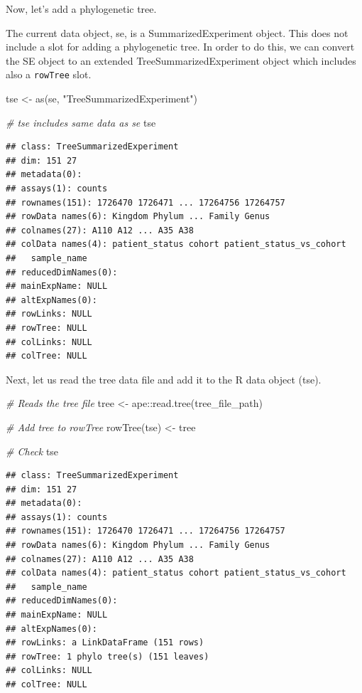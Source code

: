 \documentclass[
]{book}
\newenvironment{Shaded}{\begin{snugshade}}{\end{snugshade}}
\newcommand{\CommentTok}[1]{\textcolor[rgb]{0.56,0.35,0.01}{\textit{#1}}}
\newcommand{\FunctionTok}[1]{\textcolor[rgb]{0.00,0.00,0.00}{#1}}
\newcommand{\NormalTok}[1]{#1}
\newcommand{\OtherTok}[1]{\textcolor[rgb]{0.56,0.35,0.01}{#1}}
\newcommand{\SpecialCharTok}[1]{\textcolor[rgb]{0.00,0.00,0.00}{#1}}
\newcommand{\StringTok}[1]{\textcolor[rgb]{0.31,0.60,0.02}{#1}}
\begin{document}
Now, let's add a phylogenetic tree.

The current data object, se, is a SummarizedExperiment object. This
does not include a slot for adding a phylogenetic tree. In order to do
this, we can convert the SE object to an extended TreeSummarizedExperiment
object which includes also a \texttt{rowTree} slot.

\begin{Shaded}
\begin{Highlighting}[]
\NormalTok{tse }\OtherTok{\textless{}{-}} \FunctionTok{as}\NormalTok{(se, }\StringTok{"TreeSummarizedExperiment"}\NormalTok{)}

\CommentTok{\# tse includes same data as se}
\NormalTok{tse}
\end{Highlighting}
\end{Shaded}

\begin{verbatim}
## class: TreeSummarizedExperiment 
## dim: 151 27 
## metadata(0):
## assays(1): counts
## rownames(151): 1726470 1726471 ... 17264756 17264757
## rowData names(6): Kingdom Phylum ... Family Genus
## colnames(27): A110 A12 ... A35 A38
## colData names(4): patient_status cohort patient_status_vs_cohort
##   sample_name
## reducedDimNames(0):
## mainExpName: NULL
## altExpNames(0):
## rowLinks: NULL
## rowTree: NULL
## colLinks: NULL
## colTree: NULL
\end{verbatim}

Next, let us read the tree data file and add it to the R data object (tse).

\begin{Shaded}
\begin{Highlighting}[]
\CommentTok{\# Reads the tree file}
\NormalTok{tree }\OtherTok{\textless{}{-}}\NormalTok{ ape}\SpecialCharTok{::}\FunctionTok{read.tree}\NormalTok{(tree\_file\_path)}

\CommentTok{\# Add tree to rowTree}
\FunctionTok{rowTree}\NormalTok{(tse) }\OtherTok{\textless{}{-}}\NormalTok{ tree}

\CommentTok{\# Check}
\NormalTok{tse}
\end{Highlighting}
\end{Shaded}

\begin{verbatim}
## class: TreeSummarizedExperiment 
## dim: 151 27 
## metadata(0):
## assays(1): counts
## rownames(151): 1726470 1726471 ... 17264756 17264757
## rowData names(6): Kingdom Phylum ... Family Genus
## colnames(27): A110 A12 ... A35 A38
## colData names(4): patient_status cohort patient_status_vs_cohort
##   sample_name
## reducedDimNames(0):
## mainExpName: NULL
## altExpNames(0):
## rowLinks: a LinkDataFrame (151 rows)
## rowTree: 1 phylo tree(s) (151 leaves)
## colLinks: NULL
## colTree: NULL
\end{verbatim}
\end{document}
